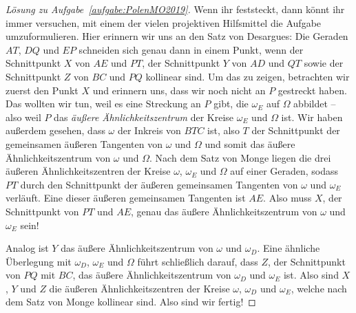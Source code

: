 \begin{proof}[Lösung zu Aufgabe~\ref{aufgabe:PolenMO2019}]
	Wenn ihr feststeckt, dann könnt ihr immer versuchen, mit einem der vielen projektiven Hilfsmittel die Aufgabe umzuformulieren. Hier erinnern wir uns an den Satz von Desargues: Die Geraden $AT$, $DQ$ und $EP$ schneiden sich genau dann in einem Punkt, wenn der Schnittpunkt $X$ von $AE$ und $PT$, der Schnittpunkt $Y$ von $AD$ und $QT$ sowie der Schnittpunkt $Z$ von $BC$ und $PQ$ kollinear sind. Um das zu zeigen, betrachten wir zuerst den Punkt $X$ und erinnern uns, dass wir noch nicht an $P$ gestreckt haben. Das wollten wir tun, weil es eine Streckung an $P$ gibt, die $\omega_E$ auf $\Omega$ abbildet -- also weil $P$ das \emph{äußere Ähnlichkeitszentrum} der Kreise $\omega_E$ und $\Omega$ ist. Wir haben außerdem gesehen, dass $\omega$ der Inkreis von $BTC$ ist, also $T$ der Schnittpunkt der gemeinsamen äußeren Tangenten von $\omega$ und $\Omega$ und somit das äußere Ähnlichkeitszentrum von $\omega$ und $\Omega$. Nach dem Satz von Monge liegen die drei äußeren Ähnlichkeitszentren der Kreise $\omega$, $\omega_E$ und $\Omega$ auf einer Geraden, sodass $PT$ durch den Schnittpunkt der äußeren gemeinsamen Tangenten von $\omega$ und $\omega_E$ verläuft. Eine dieser äußeren gemeinsamen Tangenten ist $AE$. Also muss $X$, der Schnittpunkt von $PT$ und $AE$, genau das äußere Ähnlichkeitszentrum von $\omega$ und $\omega_E$ sein!
	
	Analog ist $Y$ das äußere Ähnlichkeitszentrum von $\omega$ und $\omega_D$. Eine ähnliche Überlegung mit $\omega_D$, $\omega_E$ und $\Omega$ führt schließlich darauf, dass $Z$, der Schnittpunkt von $PQ$ mit $BC$, das äußere Ähnlichkeitszentrum von $\omega_D$ und $\omega_E$ ist. Also sind $X$, $Y$ und $Z$ die äußeren Ähnlichkeitszentren der Kreise $\omega$, $\omega_D$ und $\omega_E$, welche nach dem Satz von Monge kollinear sind. Also sind wir fertig!
\end{proof}